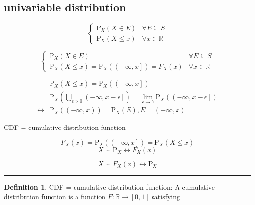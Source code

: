 \documentclass[
]{book}
\theoremstyle{definition}
\newtheorem{definition}{Definition}[chapter]
\theoremstyle{definition}
\theoremstyle{definition}
\theoremstyle{definition}
\theoremstyle{remark}
\begin{document}
\subsection{univariable distribution}\label{univariable-distribution}

\[
\begin{cases}
\mathrm{P}_{{\scriptscriptstyle X}}\left(X\in E\right) & \forall E\subseteq S\\
\mathrm{P}_{{\scriptscriptstyle X}}\left(X\le x\right) & \forall x\in\mathbb{R}
\end{cases}
\]

\[
\begin{cases}
\mathrm{P}_{{\scriptscriptstyle X}}\left(X\in E\right) & \forall E\subseteq S\\
\mathrm{P}_{{\scriptscriptstyle X}}\left(X\le x\right)=\mathrm{P}_{{\scriptscriptstyle X}}\left(\left(-\infty,x\right]\right)=F_{{\scriptscriptstyle X}}\left(x\right) & \forall x\in\mathbb{R}
\end{cases}
\]

\[
\begin{aligned}
 & \mathrm{P}_{{\scriptscriptstyle X}}\left(X\le x\right)=\mathrm{P}_{{\scriptscriptstyle X}}\left(\left(-\infty,x\right]\right)\\
= & \mathrm{P}_{{\scriptscriptstyle X}}\left(\bigcup\limits _{\epsilon>0}\left(-\infty,x-\epsilon\right]\right)=\lim_{\epsilon\rightarrow0}\mathrm{P}_{{\scriptscriptstyle X}}\left(\left(-\infty,x-\epsilon\right]\right)\\
\leftrightarrow & \mathrm{P}_{{\scriptscriptstyle X}}\left(\left(-\infty,x\right)\right)=\mathrm{P}_{{\scriptscriptstyle X}}\left(E\right),E=\left(-\infty,x\right)
\end{aligned}
\]

CDF = cumulative distribution function

\[
F_{{\scriptscriptstyle X}}\left(x\right)=\mathrm{P}_{{\scriptscriptstyle X}}\left(\left(-\infty,x\right]\right)=\mathrm{P}_{{\scriptscriptstyle X}}\left(X\le x\right)
\]
\[
X\sim\mathrm{P}_{{\scriptscriptstyle X}}\leftrightarrow F_{{\scriptscriptstyle X}}\left(x\right)
\]

\[
X\sim F_{{\scriptscriptstyle X}}\left(x\right)\leftrightarrow\mathrm{P}_{{\scriptscriptstyle X}}
\]

\begin{center}\rule{0.5\linewidth}{0.5pt}\end{center}

\begin{definition}
\protect\hypertarget{def:unnamed-chunk-5}{}\label{def:unnamed-chunk-5}CDF = cumulative distribution function: A cumulative distribution function is a function \(F:\mathbb{R} \rightarrow \left[0,1\right]\) satisfying
\end{definition}
\end{document}
